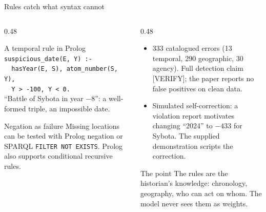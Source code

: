 \documentclass[aspectratio=169, 10pt]{beamer}
\begin{document}
\begin{frame}{Rules catch what syntax cannot}
  \begin{columns}[T]
    \begin{column}{0.48\textwidth}
      \begin{block}{A temporal rule in Prolog}
        \texttt{suspicious\_date(E, Y) :-}\\
        \texttt{\ \ hasYear(E, S), atom\_number(S, Y),}\\
        \texttt{\ \ Y > -100, Y < 0.}\\[4pt]
        \footnotesize ``Battle of Sybota in year $-8$'': a well-formed triple, an impossible date.
      \end{block}
      \begin{block}{Negation as failure}
        Missing locations can be tested with Prolog negation or SPARQL \texttt{FILTER NOT EXISTS}. Prolog also supports conditional recursive rules.
      \end{block}
    \end{column}
    \begin{column}{0.48\textwidth}
      \begin{itemize}
        \item 333 catalogued errors (13 temporal, 290 geographic, 30 agency). Full detection claim [VERIFY]; the paper reports no false positives on clean data.
        \item Simulated self-correction: a violation report motivates changing ``2024'' to $-433$ for Sybota. The supplied demonstration scripts the correction.
      \end{itemize}
      \begin{block}{The point}
        The rules are the historian's knowledge: chronology, geography, who can act on whom. The model never sees them as weights.
      \end{block}
    \end{column}
  \end{columns}
\end{frame}
\end{document}
